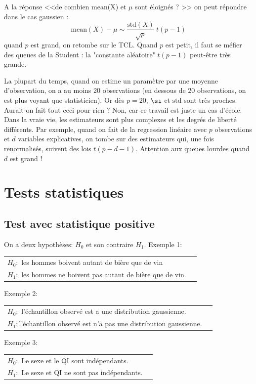 \documentclass{article}
\def\std{\text{std}}
\def\mean{\mathrm{mean}}
\begin{document}
A la réponse    <<de combien  mean(X) et $\mu$ sont éloignés ? >> on peut répondre dans le cas gaussien :
$$
    \mean(X) - \mu  \sim \frac{\std(X)}{\sqrt{p}}  \    t(p-1) 
$$
quand $p$ est grand, on retombe sur le TCL. Quand $p$ est petit, il faut se méfier des queues de la Student : la  "constante aléatoire" $t(p-1) $ peut-être très grande. 


La plupart du temps, quand on estime un paramètre par une moyenne d'observation, on a au moins 20 observations (en dessous de 20 observations, on est plus voyant que statisticien).  Or  dès $p=20$, $\si$ et $\std$ sont très proches.       Aurait-on fait tout ceci pour rien ?  Non, car  ce travail est juste un cas d'école. Dans la vraie vie, les estimateurs sont plus complexes et les degrés de liberté différents. Par exemple, quand on fait de la regression linéaire avec $p$ observations et $d$ variables explicatives, on tombe sur des estimateurs qui, une fois renormalisés, suivent des lois $t(p-d-1)$.     Attention aux queues lourdes quand $d$ est grand !



\section{Tests statistiques}


\subsection{Test avec statistique positive}

On a deux hypothèses:  $H_0$ et son contraire $H_1$.  Exemple 1: 

\begin{tabular}{ll}
$H_0:$ les hommes boivent autant de bière que de vin \\
$H_1:$ les hommes ne boivent pas autant de bière que de vin. 
\end{tabular}

Exemple 2:

\begin{tabular}{ll}
$H_0:$ l'échantillon observé est a une distribution gaussienne. \\
$H_1:$l'échantillon observé est n'a pas une distribution gaussienne. 
\end{tabular}


Exemple 3: 

\begin{tabular}{ll}
$H_0:$ Le sexe et le QI sont indépendants. \\
$H_1:$ Le sexe et QI ne sont pas indépendants. 
\end{tabular}
\end{document}
